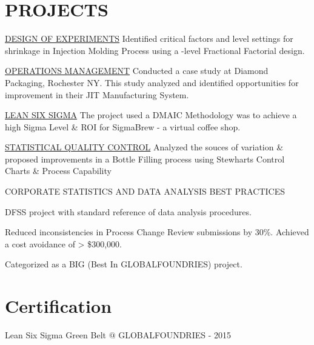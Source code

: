 \documentclass[]{bigfatnoob-resume}
\begin{document}
\begin{minipage}[t]{0.66\textwidth}
\section{PROJECTS}
\location{}
\begin{tightemize}
\item \href{http://sandeepmohan.com/files/DOE_Simulation.pdf}{\ibf DESIGN OF EXPERIMENTS} Identified critical factors and level settings for shrinkage in Injection Molding Process using a {-level Fractional Factorial design}. 
\item \href{http://sandeepmohan.com/files/JIT_At_Diamond_Packaging.pdf}{\ibf OPERATIONS MANAGEMENT} Conducted a case study at Diamond Packaging, Rochester NY. This study analyzed and identified opportunities for improvement in their {\ibf JIT} Manufacturing System.
\item \href{http://sandeepmohan.com/files/SigmaBrew_DMAIC.pdf}{\ibf LEAN SIX SIGMA} The project used a {\ibf DMAIC} Methodology was to achieve a high {\ibf Sigma Level} \& {\ibf ROI} for SigmaBrew - a virtual coffee shop.
\item \href{http://sandeepmohan.com/files/SQC_Bottle_filling.pdf}{\ibf STATISTICAL QUALITY CONTROL} Analyzed the souces of variation \& proposed improvements in a Bottle Filling process using {\ibf Stewharts Control Charts} \& {\ibf Process Capability}
\end{tightemize}
\sectionsep

\location{}
\begin{tightemize}
\item {\ibf CORPORATE STATISTICS AND DATA ANALYSIS BEST PRACTICES}
\begin{tightemize}
\vspace{\topsep}
\item {\ibf DFSS} project with standard reference of data analysis procedures.
\item  Reduced inconsistencies in Process Change Review submissions by 30\%. Achieved a cost avoidance of > \$300,000.
\item Categorized as a {\ibf BIG (Best In GLOBALFOUNDRIES)} project.
\end{tightemize}
\end{tightemize}
\sectionsep


\section{Certification}
\vspace{\topsep}
\begin{tightemize}
\item Lean Six Sigma {\ibf Green Belt} $@$ GLOBALFOUNDRIES - 2015
\end{tightemize}


\end{minipage}
\end{document}
